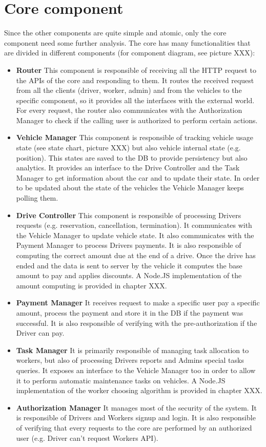 \section {Core component}
Since the other components are quite simple and atomic, only the core component need some further analysis. The core has many functionalities that are divided in different components (for component diagram, see picture XXX):
\begin{itemize}
\item \textbf{Router} This component is responsible of receiving all the HTTP request to the APIs of the core and responding to them. It routes the received request from all the clients (driver, worker, admin) and from the vehicles to the specific component, so it provides all the interfaces with the external world. For every request, the router also communicates with the Authorization Manager to check if the calling user is authorized to perform certain actions.
\item \textbf{Vehicle Manager} This component is responsible of tracking vehicle usage state (see state chart, picture XXX) but also vehicle internal state (e.g. position). This states are saved to the DB to provide persistency but also analytics. It provides an interface to the Drive Controller and the Task Manager to get information about the car and to update their state. In order to be updated about the state of the vehicles the Vehicle Manager keeps polling them.
\item \textbf{Drive Controller} This component is responsible of processing Drivers requests (e.g. reservation, cancellation, termination). It communicates with the Vehicle Manager to update vehicle state. It also communicates with the Payment Manager to process Drivers payments. It is also responsible of computing the correct amount due at the end of a drive. Once the drive has ended and the data is sent to server by the vehicle it computes the base amount to pay and applies discounts. A Node.JS implementation of the amount computing is provided in chapter XXX.
\item \textbf{Payment Manager} It receives request to make a specific user pay a specific amount, process the payment and store it in the DB if the payment was successful. It is also responsible of verifying with the pre-authorization if the Driver can pay. 
\item \textbf{Task Manager} It is primarily responsible of managing task allocation to workers, but also of processing Drivers reports and Admins special tasks queries. It exposes an interface to the Vehicle Manager too in order to allow it to perform automatic maintenance tasks on vehicles. A Node.JS implementation of the worker choosing algorithm is provided in chapter XXX.
\item \textbf{Authorization Manager} It manages most of the security of the system. It is responsible of Drivers and Workers signup and login. It is also responsible of verifying that every requests to the core are performed by an authorized user (e.g. Driver can't request Workers API). 
\end{itemize}

